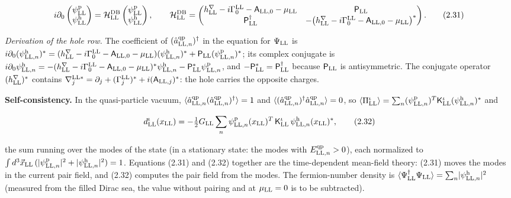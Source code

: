 \documentclass[
  10pt,
]{article}
\begin{document}
\[i\partial_0\begin{pmatrix}\psi^{\rm p}_{\rm LL}\\\psi^{\rm h}_{\rm LL}\end{pmatrix}=\mathcal H^{\rm DB}_{\rm LL}\begin{pmatrix}\psi^{\rm p}_{\rm LL}\\\psi^{\rm h}_{\rm LL}\end{pmatrix},\qquad\mathcal H^{\rm DB}_{\rm LL}=\begin{pmatrix}h^\nabla_{\rm LL}-i\Gamma^{\rm LL}_0-\mathsf A_{{\rm LL},0}-\mu_{\rm LL}&\mathsf P_{\rm LL}\\\mathsf P_{\rm LL}^\dagger&-\big(h^\nabla_{\rm LL}-i\Gamma^{\rm LL}_0-\mathsf A_{{\rm LL},0}-\mu_{\rm LL}\big)^*\end{pmatrix}.\tag{2.31}\]

\emph{Derivation of the hole row.} The coefficient of
\((\hat a^{\rm qp}_{{\rm LL},n})^\dagger\) in the equation for
\(\Psi_{\rm LL}\) is
\(i\partial_0(\psi^{\rm h}_{{\rm LL},n})^*=(h^\nabla_{\rm LL}-i\Gamma^{\rm LL}_0-\mathsf A_{{\rm LL},0}-\mu_{\rm LL})(\psi^{\rm h}_{{\rm LL},n})^*+\mathsf P_{\rm LL}(\psi^{\rm p}_{{\rm LL},n})^*\);
its complex conjugate is
\(i\partial_0\psi^{\rm h}_{{\rm LL},n}=-(h^\nabla_{\rm LL}-i\Gamma^{\rm LL}_0-\mathsf A_{{\rm LL},0}-\mu_{\rm LL})^*\psi^{\rm h}_{{\rm LL},n}-\mathsf P_{\rm LL}^*\psi^{\rm p}_{{\rm LL},n}\),
and \(-\mathsf P_{\rm LL}^*=\mathsf P_{\rm LL}^\dagger\) because
\(\mathsf P_{\rm LL}\) is antisymmetric. The conjugate operator
\((h^\nabla_{\rm LL})^*\) contains
\(\nabla^{{\rm LL}*}_j=\partial_j+(\Gamma^{\rm LL}_j)^*+i(\mathsf A_{{\rm LL},j})^*\):
the hole carries the opposite charges.

\textbf{Self-consistency.} In the quasi-particle vacuum,
\(\langle\hat a^{\rm qp}_{{\rm LL},n}(\hat a^{\rm qp}_{{\rm LL},n})^\dagger\rangle=1\)
and
\(\langle(\hat a^{\rm qp}_{{\rm LL},n})^\dagger\hat a^{\rm qp}_{{\rm LL},n}\rangle=0\),
so
\(\langle\Pi^\iota_{\rm LL}\rangle=\sum_n(\psi^{\rm p}_{{\rm LL},n})^T\mathsf K^\iota_{\rm LL}(\psi^{\rm h}_{{\rm LL},n})^*\)
and

\[d^\iota_{\rm LL}(x_{\rm LL})=-\tfrac12G_{\rm LL}\sum_n\psi^{\rm p}_{{\rm LL},n}(x_{\rm LL})^T\,\mathsf K^\iota_{\rm LL}\,\psi^{\rm h}_{{\rm LL},n}(x_{\rm LL})^*,\tag{2.32}\]

the sum running over the modes of the state (in a stationary state: the
modes with \(E^{\rm qp}_{{\rm LL},n}>0\)), each normalized to
\(\int d^3\vec x_{\rm LL}\,(\lvert\psi^{\rm p}_{{\rm LL},n}\rvert^2+\lvert\psi^{\rm h}_{{\rm LL},n}\rvert^2)=1\).
Equations (2.31) and (2.32) together are the time-dependent mean-field
theory: (2.31) moves the modes in the current pair field, and (2.32)
computes the pair field from the modes. The fermion-number density is
\(\langle\Psi^\dagger_{\rm LL}\Psi_{\rm LL}\rangle=\sum_n\lvert\psi^{\rm h}_{{\rm LL},n}\rvert^2\)
(measured from the filled Dirac sea, the value without pairing and at
\(\mu_{\rm LL}=0\) is to be subtracted).
\end{document}
